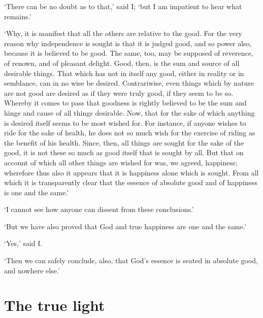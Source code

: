 \documentclass[11pt]{book}
\begin{document}
`There can be no doubt as to that,' said I; `but I am impatient to hear
what remains.'

`Why, it is manifest that all the others are relative to the good. For
the very reason why independence is sought is that it is judged good,
and so power also, because it is believed to be good. The same, too, may
be supposed of reverence, of renown, and of pleasant delight. Good,
then, is the sum and source of all desirable things. That which has not
in itself any good, either in reality or in semblance, can in no wise be
desired. Contrariwise, even things which by nature are not good are
desired as if they were truly good, if they seem to be so. Whereby it
comes to pass that goodness is rightly believed to be the sum and hinge
and cause of all things desirable. Now, that for the sake of which
anything is desired itself seems to be most wished for. For instance, if
anyone wishes to ride for the sake of health, he does not so much wish
for the exercise of riding as the benefit of his health. Since, then,
all things are sought for the sake of the good, it is not these so much
as good itself that is sought by all. But that on account of which all
other things are wished for was, we agreed, happiness; wherefore thus
also it appears that it is happiness alone which is sought. From all
which it is transparently clear that the essence of absolute good and of
happiness is one and the same.'

`I cannot see how anyone can dissent from these conclusions.'

`But we have also proved that God and true happiness are one and the
same.'

`Yes,' said I.

`Then we can safely conclude, also, that God's essence is seated in
absolute good, and nowhere else.'



\section{The true light}
\end{document}
